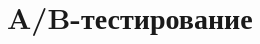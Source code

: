 \documentclass[../handbook.tex]{subfiles}
\begin{document}
\chapter{A\slash B-тестирование}
\end{document}
